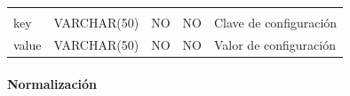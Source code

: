 \documentclass[12pt,a4paperpaper,]{report}
\let\oldparagraph\paragraph
\renewcommand{\paragraph}[1]{\oldparagraph{#1}\mbox{}}
\begin{document}
\begin{longtable}[]{@{}lllll@{}}
\begin{minipage}[t]{0.11\columnwidth}
\end{minipage}\tabularnewline
\begin{minipage}[t]{0.21\columnwidth}\raggedright\strut
key\strut
\end{minipage} & \begin{minipage}[t]{0.19\columnwidth}\raggedright\strut
VARCHAR(50)\strut
\end{minipage} & \begin{minipage}[t]{0.16\columnwidth}\raggedright\strut
NO\strut
\end{minipage} & \begin{minipage}[t]{0.19\columnwidth}\raggedright\strut
NO\strut
\end{minipage} & \begin{minipage}[t]{0.11\columnwidth}\raggedright\strut
Clave de configuración\strut
\end{minipage}\tabularnewline
\begin{minipage}[t]{0.21\columnwidth}\raggedright\strut
value\strut
\end{minipage} & \begin{minipage}[t]{0.19\columnwidth}\raggedright\strut
VARCHAR(50)\strut
\end{minipage} & \begin{minipage}[t]{0.16\columnwidth}\raggedright\strut
NO\strut
\end{minipage} & \begin{minipage}[t]{0.19\columnwidth}\raggedright\strut
NO\strut
\end{minipage} & \begin{minipage}[t]{0.11\columnwidth}\raggedright\strut
Valor de configuración\strut
\end{minipage}\tabularnewline
\bottomrule
\end{longtable}

\paragraph{Normalización}\label{normalizaciuxf3n-9}
\end{document}
